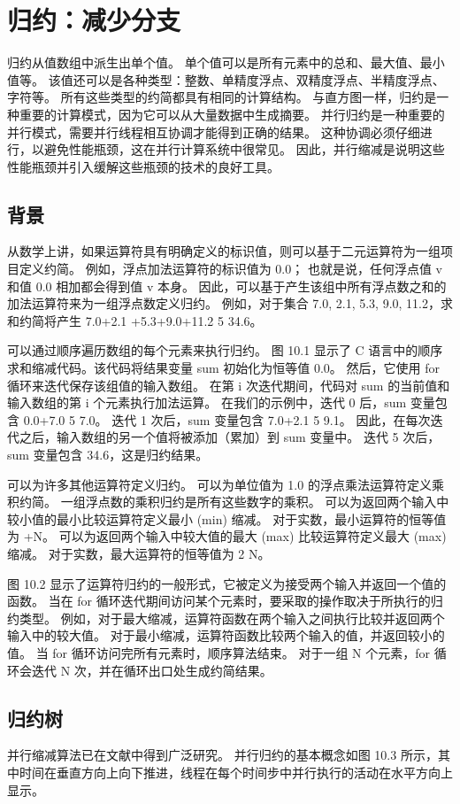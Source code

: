 \section{归约：减少分支}
归约从值数组中派生出单个值。 单个值可以是所有元素中的总和、最大值、最小值等。 该值还可以是各种类型：整数、单精度浮点、双精度浮点、半精度浮点、字符等。 所有这些类型的约简都具有相同的计算结构。 与直方图一样，归约是一种重要的计算模式，因为它可以从大量数据中生成摘要。 并行归约是一种重要的并行模式，需要并行线程相互协调才能得到正确的结果。 这种协调必须仔细进行，以避免性能瓶颈，这在并行计算系统中很常见。 因此，并行缩减是说明这些性能瓶颈并引入缓解这些瓶颈的技术的良好工具。

\subsection{背景}
从数学上讲，如果运算符具有明确定义的标识值，则可以基于二元运算符为一组项目定义约简。 例如，浮点加法运算符的标识值为 0.0； 也就是说，任何浮点值 v 和值 0.0 相加都会得到值 v 本身。 因此，可以基于产生该组中所有浮点数之和的加法运算符来为一组浮点数定义归约。 例如，对于集合 {7.0, 2.1, 5.3, 9.0, 11.2}，求和约简将产生 7.0+2.1 +5.3+9.0+11.2 5 34.6。

可以通过顺序遍历数组的每个元素来执行归约。 图 10.1 显示了 C 语言中的顺序求和缩减代码。该代码将结果变量 sum 初始化为恒等值 0.0。 然后，它使用 for 循环来迭代保存该组值的输入数组。 在第 i 次迭代期间，代码对 sum 的当前值和输入数组的第 i 个元素执行加法运算。 在我们的示例中，迭代 0 后，sum 变量包含 0.0+7.0 5 7.0。 迭代 1 次后，sum 变量包含 7.0+2.1 5 9.1。 因此，在每次迭代之后，输入数组的另一个值将被添加（累加）到 sum 变量中。 迭代 5 次后，sum 变量包含 34.6，这是归约结果。

可以为许多其他运算符定义归约。 可以为单位值为 1.0 的浮点乘法运算符定义乘积约简。 一组浮点数的乘积归约是所有这些数字的乘积。 可以为返回两个输入中较小值的最小比较运算符定义最小 (min) 缩减。 对于实数，最小运算符的恒等值为 +N。 可以为返回两个输入中较大值的最大 (max) 比较运算符定义最大 (max) 缩减。 对于实数，最大运算符的恒等值为 2 N。

图 10.2 显示了运算符归约的一般形式，它被定义为接受两个输入并返回一个值的函数。 当在 for 循环迭代期间访问某个元素时，要采取的操作取决于所执行的归约类型。 例如，对于最大缩减，运算符函数在两个输入之间执行比较并返回两个输入中的较大值。 对于最小缩减，运算符函数比较两个输入的值，并返回较小的值。 当 for 循环访问完所有元素时，顺序算法结束。 对于一组 N 个元素，for 循环会迭代 N 次，并在循环出口处生成约简结果。

\subsection{归约树}
并行缩减算法已在文献中得到广泛研究。 并行归约的基本概念如图 10.3 所示，其中时间在垂直方向上向下推进，线程在每个时间步中并行执行的活动在水平方向上显示。

